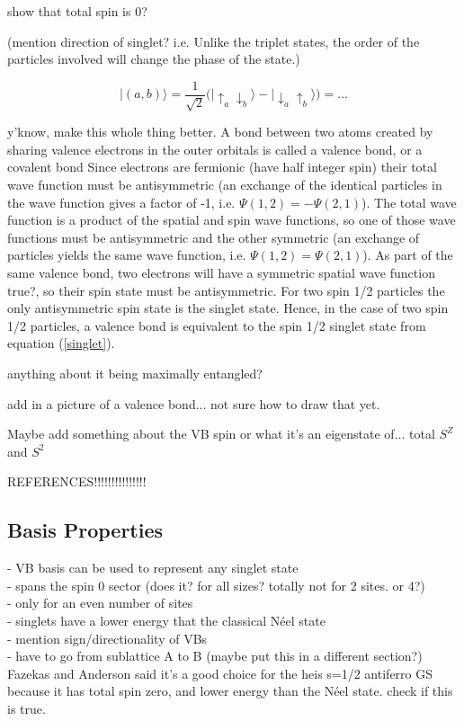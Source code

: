   {\color{red} show that total spin is 0?
  
  (mention direction of singlet? i.e. Unlike the triplet states, the order of the particles involved will change the phase of the state.)

\begin{equation}
   \lvert(a,b)\rangle = \frac{1}{\sqrt{2}}\big( \lvert \uparrow_a \downarrow_b \rangle - \lvert \downarrow_a \uparrow_b \rangle \big) = ...
   \label{eqn_vb}
\end{equation}
}

{\color{red} y'know, make this whole thing better.}
A bond between two atoms created by sharing valence electrons in the outer orbitals is called a valence bond, or a covalent bond \cite{Slater1931,Pauling1933} 
Since electrons are fermionic (have half integer spin) their total
wave function must be antisymmetric (an exchange of the identical particles in the wave function
gives a factor of -1, i.e. $\Psi(1,2) = -\Psi(2,1)$).
The total wave function is a product of the spatial and spin wave functions, so one of those wave functions must be antisymmetric and the other symmetric (an exchange of particles yields the same wave function, i.e. $\Psi(1,2) = \Psi(2,1)$).
As part of the same valence bond, two electrons will have a symmetric spatial wave function {\color{red} true?}, so their spin state must be antisymmetric.  For two spin 1/2 particles the only antisymmetric spin state is the singlet state.  
Hence, in the case of two spin 1/2 particles, a valence bond is equivalent to the spin 1/2 singlet state from equation (\ref{singlet}).

{\color{red} anything about it being maximally entangled?}

{\color{red} add in a picture of a valence bond... not sure how to draw that yet.

 Maybe add something about the VB spin or what it's an eigenstate of... total 
$S^Z$ and $S^2$

REFERENCES!!!!!!!!!!!!!!!
}

\subsection{Basis Properties}

- VB basis can be used to represent any singlet state\\
- spans the spin 0 sector (does it?  for all sizes? totally not for 2 sites. or 4?)\\
- only for an even number of sites\\
- singlets have a lower energy that the classical N\'eel state\\
- mention sign/directionality of VBs\\
- have to go from sublattice A to B (maybe put this in a different section?)\\
{\color{red} Fazekas and Anderson said it's a good choice for the heis s=1/2 antiferro GS
because it has total spin zero, and lower energy than the N\'eel state.  check if this is true.}

